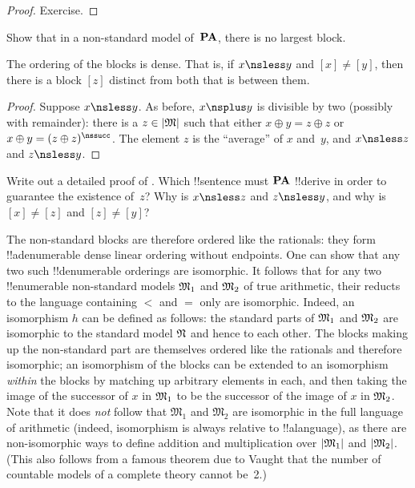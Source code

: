 \documentclass[../../../include/open-logic-section]{subfiles}
\begin{document}
\begin{proof}
Exercise.
\end{proof}

\begin{prob}
Show that in a non-standard model of~$\mathbf{PA}$, there is no largest
block.
\end{prob}

\begin{prop}
The ordering of the blocks is dense. That is, if $x \nsless y$ and
$[x] \neq [y]$, then there is a block $[z]$ distinct from both that is
between them.
\end{prop}

\begin{proof}
Suppose $x \nsless y$. As before, $x \nsplus y$ is divisible by two
(possibly with remainder): there is a $z \in \Domain{M}$ such that
either $x \oplus y = z \oplus z$ or $x \oplus y = (z \oplus
z)^\nssucc$. The element $z$ is the ``average'' of $x$ and~$y$, and $x
\nsless z$ and $z \nsless y$.
\end{proof}

\begin{prob}
Write out a detailed proof of
. Which !!{sentence} must
$\mathbf{PA}$ !!{derive} in order to guarantee the existence of~$z$? Why
is $x \nsless z$ and $z \nsless y$, and why is $[x] \neq [z]$ and $[z]
\neq [y]$?
\end{prob}

\begin{explain}
The non-standard blocks are therefore ordered like the rationals: they
form !!a{denumerable} dense linear ordering without endpoints.  One can show
that any two such !!{denumerable} orderings are isomorphic. It follows
that for any two !!{enumerable} non-standard models $\Struct{M}_1$ and
$\Struct{M_2}$ of true arithmetic, their reducts to the language
containing $<$ and $=$ only are isomorphic. Indeed, an isomorphism $h$
can be defined as follows: the standard parts of $\Struct{M_1}$ and
$\Struct{M_2}$ are isomorphic to the standard model $\Struct{N}$ and
hence to each other. The blocks making up the non-standard part are
themselves ordered like the rationals and therefore isomorphic; an
isomorphism of the blocks can be extended to an isomorphism
\emph{within} the blocks by matching up arbitrary elements in each,
and then taking the image of the successor of $x$ in $\Struct{M_1}$ to
be the successor of the image of $x$ in $\Struct{M_2}$. Note that it
does \emph{not} follow that $\mathfrak{M}_1$ and $\mathfrak{M}_2$ are
isomorphic in the full language of arithmetic (indeed, isomorphism is
always relative to !!a{language}), as there are non-isomorphic ways to
define addition and multiplication over $\Domain{M_1}$ and
$\Domain{M_2}$. (This also follows from a famous theorem due to Vaught
that the number of countable models of a complete theory cannot be~2.)
\end{explain}
\end{document}
